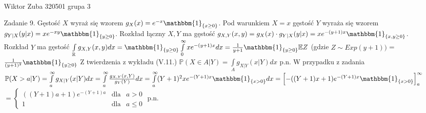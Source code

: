 \documentclass{article}
\begin{document}
Wiktor Zuba 320501 grupa 3
\newline

Zadanie 9.
\newline
\newline
Gęstość $X$ wyraż się wzorem $g_X(x)=e^{-x}\mathbbm{1}_{\{x\ge0\}}$.\newline
Pod warunkiem $X=x$ gęstość $Y$ wyraża się wzorem $g_{Y|X}(y|x)=xe^{-xy}\mathbbm{1}_{\{y\ge0\}}$.\newline
Rozkład łączny $X,Y$ ma gęstość $g_{X,Y}(x,y)=g_X(x)\cdot g_{Y|X}(y|x)=xe^{-(y+1)x}\mathbbm{1}_{\{x,y\ge0\}}$.\newline
Rozkład $Y$ ma gęstość $\int\limits_{\mathbb{R}}g_{X,Y}(x,y)dx=\mathbbm{1}_{\{y\ge0\}}\int\limits_{0}^{\infty}xe^{-(y+1)x}dx=
\frac{1}{y+1}\mathbbm{1}_{\{y\ge0\}}\mathbb{E}Z$ (gdzie $Z\sim Exp(y+1))$ =$\frac{1}{(y+1)^2}\mathbbm{1}_{\{y\ge0\}}$\newline
Z twierdzenia z wykładu (V.11.) $\mathbb{P}(X\in A|Y)=\int\limits_{A}g_{X|Y}(x|Y)dx$ p.n.\newline
W przypadku z zadania $\mathbb{P}(X>a|Y)=\int\limits_{a}^{\infty}g_{X|Y}(x|Y)dx=\int\limits_{a}^{\infty}\frac{g_{X,Y}(x,Y)}{g_{Y}(Y)}dx=
\int\limits_{a}^{\infty}(Y+1)^2xe^{-(Y+1)x}\mathbbm{1}_{\{x>0\}}dx=\left[-((Y+1)x+1)e^{-(Y+1)x}\mathbbm{1}_{\{x>0\}}\right]_{a}^{\infty}$\newline
$=\left\{
\begin{array}{ccc}
((Y+1)a+1)e^{-(Y+1)a}&\text{dla}&a>0\\
1&\text{dla}&a\le0
\end{array}\right.$ p.n.
\end{document}
